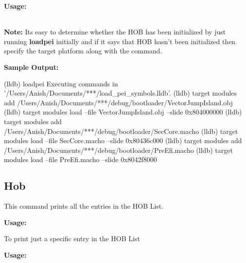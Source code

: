 \textcolor{SmokeyDarkBlue}{\bfseries Usage:} \\
 \\

\textbf{Note:} Its easy to determine whether the HOB has been initialized by just
running \textcolor{SmokeyDarkBlue}{\bfseries loadpei} initially and if
it says that HOB hasn't been initialized then specify the target platform
along with the command.

\textcolor{SmokeyDarkBlue}{\bfseries Sample Output:} \\
\begin{TerminalOutput}
(lldb) loadpei
Executing commands in '/Users/Anish/Documents/***/load_pei_symbols.lldb'.
(lldb) target modules add /Users/Anish/Documents/***/debug/bootloader/VectorJumpIsland.obj
(lldb) target modules load --file VectorJumpIsland.obj --slide 0x804000000
(lldb) target modules add /Users/Anish/Documents/***/debug/bootloader/SecCore.macho
(lldb) target modules load --file SecCore.macho --slide 0x80436c000
(lldb) target modules add /Users/Anish/Documents/***/debug/bootloader/PreEfi.macho
(lldb) target modules load --file PreEfi.macho --slide 0x8042f8000
\end{TerminalOutput}

\subsection{Hob}

This command prints all the entries in the HOB List.

\textcolor{SmokeyDarkBlue}{\bfseries Usage:} 

To print just a specific entry in the HOB List

\textcolor{SmokeyDarkBlue}{\bfseries Usage:} 

